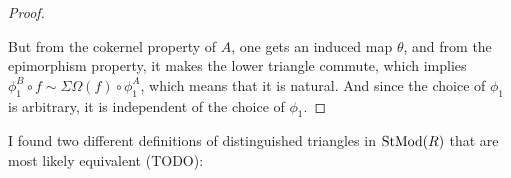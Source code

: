 \begin{proof}
    \begin{center}
    \end{center}

    But from the cokernel property of \( A \), one gets an induced map \( \theta \), and from the epimorphism property, it makes the lower triangle commute, which implies \( \phi_1^B \circ f \sim \Sigma\Omega(f) \circ \phi_1^A \), which means that it is natural. And since the choice of \( \phi_1 \) is arbitrary, it is independent of the choice of \( \phi_1 \).
\end{proof}

I found two different definitions of distinguished triangles in \( \operatorname{StMod}(R) \) that are most likely equivalent (TODO):


